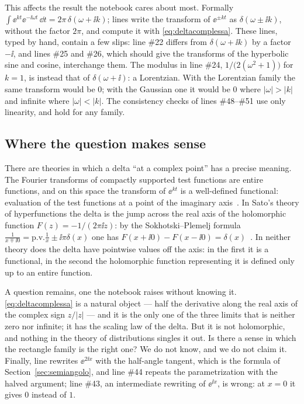 This affects the result the notebook cares about most. Formally
$\int\ee^{kt}\ee^{-\ii\omega t}\,\dd t=2\pi\,\delta(\omega+\ii k)$; lines
 write the transform of $\ee^{\pm kt}$ as
$\delta(\omega\pm\ii k)$, without the factor $2\pi$, and compute it with
\eqref{eq:deltacomplessa}. These lines, typed by hand, contain a few slips:
line \#22 differs from $\delta(\omega+\ii k)$ by a factor $-\ii$, and lines
\#25 and \#26, which should give the transforms of the hyperbolic sine and
cosine, interchange them. The modulus in line \#24,
$1/\bigl(2(\omega^2+1)\bigr)$ for $k=1$, is instead that of
$\delta(\omega+\ii)$: a Lorentzian. With the Lorentzian family the same
transform would be $0$; with the Gaussian one it would be $0$ where
$|\omega|>|k|$ and infinite where $|\omega|<|k|$. The consistency checks of lines \#48--\#51 use only
linearity, and hold for any family.

\subsection{Where the question makes sense}

There are theories in which a delta ``at a complex point'' has a precise
meaning. The Fourier transforms of compactly supported test functions are
entire functions, and on this space the transform of $\ee^{kt}$ is a
well-defined functional: evaluation of the test functions at a point of the
imaginary axis~\cite{gelfand1964}. In Sato's theory of hyperfunctions the
delta is the jump across the real axis of the holomorphic function
$F(z)=-1/(2\pi\ii z)$: by the Sokhotski--Plemelj formula
$\frac{1}{x\mp\ii0}=\mathrm{p.v.}\frac1x\pm\ii\pi\delta(x)$ one has
$F(x+\ii0)-F(x-\ii0)=\delta(x)$~\cite{kaneko1988}. In neither theory does the
delta have pointwise values off the axis: in the first it is a functional, in
the second the holomorphic function representing it is defined only up to an
entire function.

A question remains, one the notebook raises without knowing it.
\eqref{eq:deltacomplessa} is a natural object --- half the derivative along
the real axis of the complex sign $z/|z|$ --- and it is the only one of the
three limits that is neither zero nor infinite; it has the scaling law of the
delta. But it is not holomorphic, and nothing in the theory of distributions
singles it out. Is there a sense in which the rectangle family is the right
one? We do not know, and we do not claim it. Finally, line
 rewrites $\ee^{2\ii x}$ with the half-angle tangent,
which is the formula of Section~\ref{sec:semiangolo}, and line \#44 repeats
the parametrization with the halved argument; line \#43, an intermediate
rewriting of $\ee^{\ii x}$, is wrong: at $x=0$ it gives $0$ instead of $1$.
